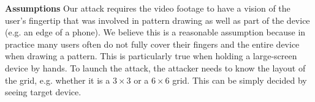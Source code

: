\noindent \textbf{Assumptions}
Our attack requires the video footage to have a vision of the user's
fingertip that was involved in pattern drawing as well as part of the device (e.g. an edge of a phone).
We believe this is a reasonable assumption because in practice many users often do not fully cover their fingers and the entire device when drawing a pattern.
This is particularly true when holding a large-screen device by hands.
To launch the
attack, the attacker needs to know the layout of the grid, e.g. whether it is
a $3 \times 3$ or a $6 \times 6$ grid. This can be simply decided by seeing target device.

